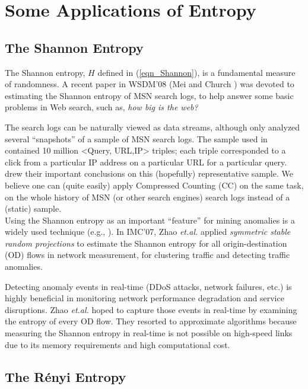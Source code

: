 \documentclass{sig-alternate}
\begin{document}
\section{Some Applications of Entropy}\label{sec_entropy}

\subsection{The Shannon Entropy}

The Shannon entropy, $H$ defined in (\ref{eqn_Shannon}), is a fundamental measure of randomness. A recent paper in WSDM'08 (Mei and Church \cite{Proc:Mei_WSDM08}) was devoted to estimating the Shannon entropy of MSN search logs, to help answer some basic problems in Web search, such as,  {\em how big is the web?}

The search logs can be naturally viewed as data streams, although \cite{Proc:Mei_WSDM08} only analyzed several ``snapshots'' of a sample of MSN search logs.  The sample used in \cite{Proc:Mei_WSDM08} contained 10 million <Query, URL,IP> triples; each triple corresponded to a click from a particular IP address on a particular URL for a particular query.  \cite{Proc:Mei_WSDM08} drew their important conclusions on this (hopefully) representative sample. We believe one can (quite easily) apply Compressed Counting (CC) on the same task, on the whole history of MSN (or other search engines) search logs instead of a (static) sample.\\


Using the Shannon entropy as an important ``feature'' for mining anomalies is a widely used technique (e.g., \cite{Proc:Lakhina_SIGCOMM05}). In IMC'07, Zhao {\it et.al.}\cite{Proc:Zhao_IMC07} applied {\em symmetric stable random projections} to estimate the Shannon entropy for all origin-destination (OD) flows in network measurement, for clustering traffic and detecting traffic anomalies.

Detecting anomaly events in real-time (DDoS attacks, network failures, etc.) is highly beneficial in monitoring network performance degradation and service disruptions. Zhao {\it et.al.}\cite{Proc:Zhao_IMC07}  hoped to capture those events in real-time by examining the entropy of every OD flow.  They resorted to approximate algorithms because measuring the Shannon entropy in real-time is not possible on high-speed links due to its memory requirements and high computational cost.\\


\subsection{The R\'enyi Entropy}
\end{document}
